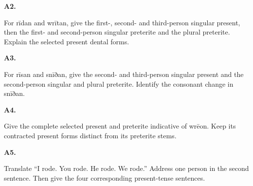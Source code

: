 \par\begin{minipage}{\linewidth}\raggedright
\textbf{A2.}

For rīdan and wrītan, give the first-, second- and third-person singular present, then the first- and second-person singular preterite and the plural preterite. Explain the selected present dental forms.

\end{minipage}\par\addvspace{4pt}

\par\begin{minipage}{\linewidth}\raggedright
\textbf{A3.}

For rīsan and snīðan, give the second- and third-person singular present and the second-person singular and plural preterite. Identify the consonant change in snīðan.

\end{minipage}\par\addvspace{4pt}

\par\begin{minipage}{\linewidth}\raggedright
\textbf{A4.}

Give the complete selected present and preterite indicative of wrēon. Keep its contracted present forms distinct from its preterite stems.

\end{minipage}\par\addvspace{4pt}

\par\begin{minipage}{\linewidth}\raggedright
\textbf{A5.}

Translate “I rode. You rode. He rode. We rode.” Address one person in the second sentence. Then give the four corresponding present-tense sentences.

\end{minipage}\par\addvspace{4pt}

